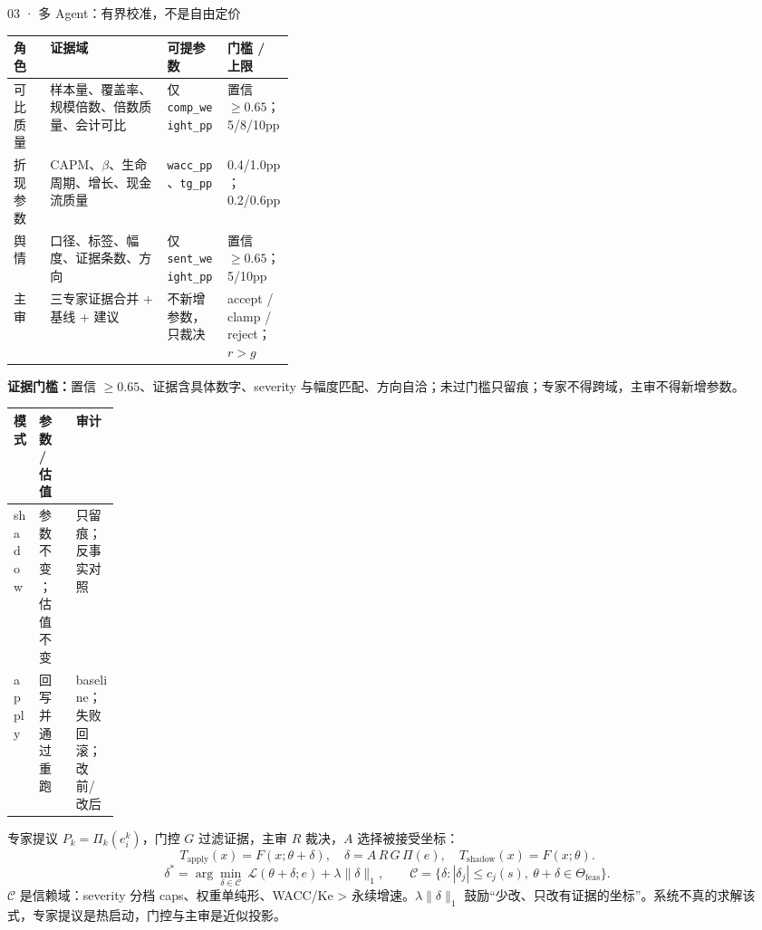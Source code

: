 \documentclass[final]{beamer}
\newcommand{\kw}[1]{\textcolor{csred}{\textbf{#1}}}
\begin{document}
\begin{frame}[t]
\begin{columns}[t,onlytextwidth]
\begin{column}{0.315\textwidth}
\end{column}

\begin{column}{0.315\textwidth}

\begin{block}{03 ·  多 Agent：有界校准，不是自由定价}
{\fontsize{22}{28}\selectfont
\begin{tabularx}{\linewidth}{@{}>{\raggedright\arraybackslash}p{0.13\linewidth}YYp{0.24\linewidth}@{}}
\toprule
\kw{角色} & \kw{证据域} & \kw{可提参数} & \kw{门槛 / 上限} \\
\midrule
可比质量 & 样本量、覆盖率、规模倍数、倍数质量、会计可比 & 仅 \texttt{comp\_weight\_pp} & 置信 \(\ge0.65\)；5/8/10pp \\
折现参数 & CAPM、\(\beta\)、生命周期、增长、现金流质量 & \texttt{wacc\_pp}、\texttt{tg\_pp} & 0.4/1.0pp；0.2/0.6pp \\
舆情 & 口径、标签、幅度、证据条数、方向 & 仅 \texttt{sent\_weight\_pp} & 置信 \(\ge0.65\)；5/10pp \\
主审 & 三专家证据合并 + 基线 + 建议 & 不新增参数，只裁决 & accept / clamp / reject；\(r>g\) \\
\bottomrule
\end{tabularx}}

\vspace{1mm}
{\bfseries 证据门槛：}置信 \(\ge0.65\)、证据含具体数字、severity 与幅度匹配、方向自洽；未过门槛只留痕；专家不得跨域，主审不得新增参数。

{\fontsize{22}{28}\selectfont
\begin{tabularx}{\linewidth}{@{}p{0.14\linewidth}YY@{}}
\toprule
模式 & 参数 / 估值 & 审计 \\
\midrule
shadow & 参数不变；估值不变 & 只留痕；反事实对照 \\
apply & 回写并通过重跑 & baseline；失败回滚；改前/改后 \\
\bottomrule
\end{tabularx}}

\vspace{2mm}
专家提议 \(P_k=\Pi_k(e_i^k)\)，门控 \(G\) 过滤证据，主审 \(R\) 裁决，\(A\) 选择被接受坐标：
{\fontsize{24}{30}\selectfont
\[
T_{\mathrm{apply}}(x)=F(x;\theta+\delta),\quad \delta=A\,R\,G\,\Pi(e),\quad
T_{\mathrm{shadow}}(x)=F(x;\theta).
\]
}
{\fontsize{24}{30}\selectfont
\[
\delta^*=\arg\min_{\delta\in\mathcal C}\ \mathcal L(\theta+\delta;e)+\lambda\|\delta\|_1,\qquad
\mathcal C=\{\delta:|\delta_j|\le c_j(s),\ \theta+\delta\in\Theta_{\mathrm{feas}}\}.
\]
}
\(\mathcal C\) 是信赖域：severity 分档 caps、权重单纯形、WACC/Ke > 永续增速。\(\lambda\|\delta\|_1\) 鼓励“少改、只改有证据的坐标”。系统不真的求解该式，专家提议是热启动，门控与主审是近似投影。


\end{block}
\end{column}
\end{columns}
\end{frame}
\end{document}
